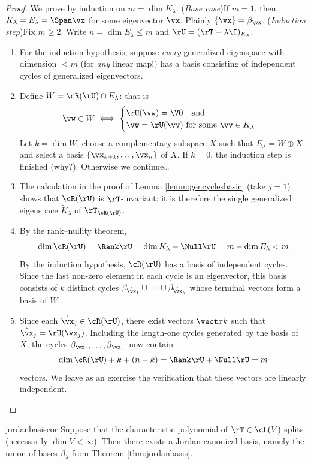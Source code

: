 \begin{proof}
We prove by induction on $m=\dim K_\lambda$.\smallbreak
(\emph{Base case})\quad  If $m=1$, then $K_\lambda=E_\lambda=\Span\vx$ for some eigenvector $\vx$. Plainly $\{\vx\}=\beta_\vx$.\smallbreak
(\emph{Induction step})\quad  Fix $m\ge 2$. Write $n=\dim E_\lambda\le m$ and $\rU=(\rT-\lambda\I)_{K_\lambda}$. 
\begin{enumerate}\renewcommand{\labelenumi}{(\roman{enumi})}\itemsep0pt
  \item For the induction hypothesis, suppose \emph{every} generalized eigenspace with dimension $<m$ (for \emph{any} linear map!) has a basis consisting of independent cycles of generalized eigenvectors.
  \item Define $W=\cR(\rU)\cap E_\lambda$: that is
  \[\vw\in W\iff\begin{cases}
  \rU(\vw)=\V0\quad\text{and}\\
  \vw=\rU(\vv)\text{ for some }\vv\in K_\lambda
  \end{cases}\]
  Let $k=\dim W$, choose a complementary subspace $X$ such that $E_\lambda=W\oplus X$ and select a basis $\{\vx_{k+1},\ldots,\vx_n\}$ of $X$. If $k=0$, the induction step is finished (why?). Otherwise we continue\ldots
  \item The calculation in the proof of Lemma \ref{lemm:gencyclesbasic} (take $j=1$) shows that $\cR(\rU)$ is $\rT$-invariant; it is therefore the single generalized eigenspace $\tilde{K}_\lambda$ of $\rT_{\cR(\rU)}$.
  \item By the rank--nullity theorem,
	\[\dim \cR(\rU)=\Rank\rU=\dim K_\lambda-\Null\rU=m-\dim E_\lambda <m\]
	By the induction hypothesis, $\cR(\rU)$ has a basis of independent cycles. Since the last non-zero element in each cycle is an eigenvector, this basis consists of $k$ distinct cycles $\beta_{\hat\vx_1}\cup\cdots\cup\beta_{\hat\vx_k}$ whose terminal vectors form a basis of $W$.
  \item Since each $\hat\vx_j\in\cR(\rU)$, there exist vectors $\vect xk$ such that $\hat\vx_j=\rU(\vx_j)$. Including the length-one cycles generated by the basis of $X$, the cycles $\beta_{\vx_1},\ldots,\beta_{\vx_n}$ now contain
  \[\dim\cR(\rU)+k+(n-k)=\Rank\rU+\Null\rU=m\]
  vectors. We leave as an exercise the verification that these vectors are linearly independent.\qedhere
\end{enumerate} 
\end{proof}

\begin{cor}{}{jordanbasiscor}
Suppose that the characteristic polynomial of $\rT\in\cL(V)$ splits (necessarily $\dim V<\infty$). Then there exists a Jordan canonical basis, namely the union of bases $\beta_\lambda$ from Theorem \ref{thm:jordanbasis}.
\end{cor}


